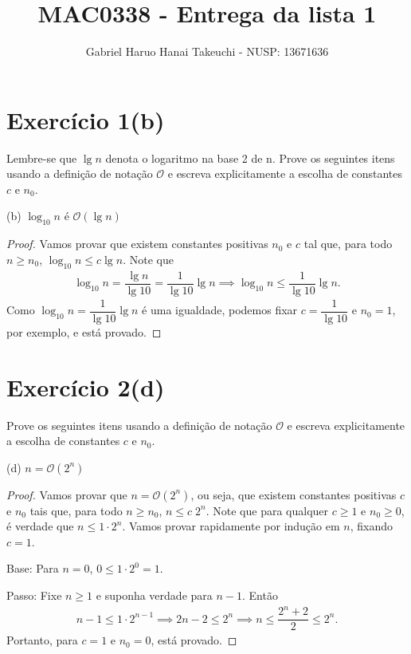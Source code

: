 \documentclass{article}
\title{MAC0338 - Entrega da lista 1}
\date{}
\author{Gabriel Haruo Hanai Takeuchi - NUSP: 13671636}
\newcommand{\bigO}[1]{\ensuremath{\mathcal{O}(#1)}}
\begin{document}
\maketitle

\section*{Exercício 1(b)}
Lembre-se que $\lg n$ denota o logaritmo na base 2 de n. Prove os seguintes itens usando a definição de notação $\mathcal{O}$ e escreva explicitamente a escolha de constantes $c$ e $n_0$.

(b) $\log_{10} n$ é $\bigO{\lg n}$

\begin{proof}
Vamos provar que existem constantes positivas $n_0$ e $c$ tal que, para todo $n \geq n_0$, $\log_{10} n \leq c \lg n$.
Note que
\begin{align*}
  \log_{10} n = \dfrac{\lg n}{\lg 10} = \dfrac{1}{\lg 10}\lg n \implies \log_{10} n \leq \dfrac{1}{\lg 10} \lg n .
\end{align*}
Como $\log_{10} n = \dfrac{1}{\lg 10}\lg n$ é uma igualdade, podemos fixar $c = \dfrac{1}{\lg 10}$ e $n_0 = 1$, por exemplo, e está provado.

\end{proof}

\newpage

\section*{Exercício 2(d)}
Prove os seguintes itens usando a definição de notação $\mathcal{O}$ e escreva explicitamente a escolha de constantes $c$ e $n_0$.

(d) $n = \bigO{2^n}$

\begin{proof}
Vamos provar que $n = \bigO{2^n}$, ou seja, que existem constantes positivas $c$ e $n_0$ tais que, para todo $n \geq n_0$, $n \leq c \; 2^n$.
Note que para qualquer $c \geq 1$ e $n_0 \geq 0$, é verdade que $n \leq 1 \cdot 2^n$.
Vamos provar rapidamente por indução em $n$, fixando $c=1$.

Base: Para $n=0$, $0 \leq 1 \cdot 2^0 = 1$.

Passo: Fixe $n \geq 1$ e suponha verdade para $n-1$. Então
\begin{align*}
  n-1 \leq 1 \cdot 2^{n-1} \implies 2n - 2 \leq 2^n \implies n \leq \dfrac{2^n + 2}{2} \leq 2^n .
\end{align*}
Portanto, para $c = 1$ e $n_0 = 0$, está provado.

\end{proof}
\end{document}
